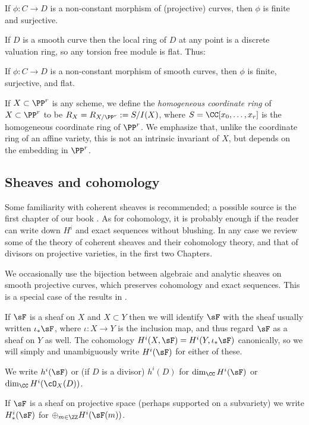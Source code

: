 \begin{corollary}
If $\phi: C\to D$ is a non-constant morphism of (projective) curves, then $\phi$ is finite and surjective. 
\end{corollary}

If $D$ is a 
smooth curve then the local ring of $D$ at any point is a discrete valuation ring, so any torsion free module is flat. 
Thus:

\begin{proposition}
If $\phi: C\to D$ is a non-constant morphism of smooth curves, then $\phi$ is finite, surjective, and flat.
\end{proposition}

If $X\subset \PP^{r}$ is any scheme, we define the \emph{homogeneous coordinate ring} of $X\subset \PP^{r}$
to be $R_{X} = R_{X/\PP^{r}}:= S/I(X)$, where $S =\CC[x_{0}, \dots, x_{r}]$ is the homogeneous coordinate ring of $\PP^{r}$. We emphasize
that, unlike the coordinate ring of an affine variety, this is not an intrinsic invariant of $X$, but depends on the 
embedding in $\PP^{r}$. 

\subsection {Sheaves and cohomology} 

Some familiarity with coherent sheaves is recommended; a possible source is
the first chapter of our book \cite{GeomSchemes}. 
As for cohomology, it is probably enough if the reader can write down $H^i$ and exact sequences without blushing.
In any case we review some of the theory of coherent sheaves and their cohomology theory, and that of divisors on projective 
varieties, in the first two Chapters. 

We occasionally use the bijection between algebraic and analytic sheaves on smooth projective curves, which preserves
cohomology and exact sequences. This is a special case of the results in \cite{GAGA}. 

If $\sF$ is a sheaf on $X$ and $X\subset Y$ then we will identify $\sF$ with
the sheaf usually written $\iota_*\sF$, where $\iota:X\to Y$ is the inclusion map,
 and thus regard $\sF$ as a sheaf on $Y$ as well.
The cohomology  $H^i(X, \sF) = H^i(Y,\iota_*\sF)$ canonically, so we will
simply and unambiguously write $H^i(\sF)$ for either of these. 

We write $h^i(\sF)$ or (if $D$ is a divisor) $h^{i}(D)$ for 
$\dim_{\CC}H^i(\sF)$ or $\dim_{\CC}H^i(\cO_X(D))$. 

If $\sF$ is a sheaf on projective space (perhaps supported on a subvariety) we write $H^i_*(\sF)$ for
$\oplus_{m\in \ZZ} H^i(\sF(m))$. 





